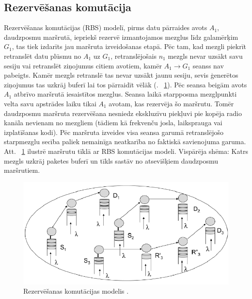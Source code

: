 \subsection{Rezervēšanas komutācija}
Rezervēšanas komutācijas (\acs{RBS}) modelī, pirms datu pārraides avots $A_{1}$, daudzposmu maršrutā, iepriekš rezervē izmantojamos mezglus līdz galamērķim $G_{1}$, tas tiek izdarīts jau maršruta izveidošanas etapā. Pēc tam, kad mezgli piekrīt retranslēt datu plūsmu no $A_{1}$ uz $G_{1}$, retranslējošais $n_{1}$ mezgls nevar uzsākt savu sesiju vai retranslēt ziņojumus citiem avotiem, kamēr $A_{1}\rightarrow G_{1}$ seanss nav pabeigts. Kamēr mezgls retranslē tas nevar uzsākt jaunu sesiju, sevis  ģenerētos ziņojumus tas uzkrāj buferī lai tos pārraidīt  vēlāk (\figurename. ~\ref{fig:rb}). Pēc seansa beigām avots $A_{1}$ atbrīvo maršrutā iesaistītos mezglus. Seansa laikā starpposma mezglpunkti velta savu apstrādes laiku tikai $A_{1}$ avotam, kas rezervēja šo maršrutu. Tomēr daudzposmu maršruta rezervēšana nesniedz ekskluzīvu piekļuvi pie kopēja radio kanāla nevienam no mezgliem (tādiem kā frekvenču josla, laiksprauga vai izplatīšanas kodi). Pēc maršruta izveides visa seansa garumā retranslējošo starpmezglu secība paliek nemainīga neatkarība no faktiskā savienojuma garuma. Att. ~\ref{fig:rb} ilustrē maršrutu tīklā ar RBS komutācijas modeli. Vispārēja shēma: Katrs mezgls uzkrāj paketes buferī un tīkls sastāv no atsevišķiem daudzposmu maršrutiem.
\begin{figure}[htb!]
\centering
\includegraphics[scale=0.4]{./graph/rb_queue.png}
\caption{Rezervēšanas komutācijas modelis \cite{route_res}.}
\label{fig:rb}
\end{figure}

